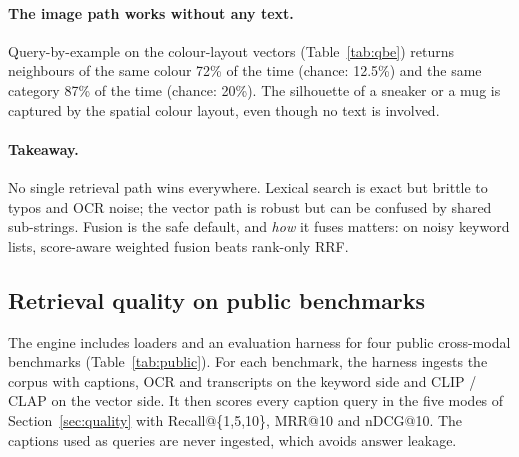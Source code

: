 \documentclass[11pt,a4paper]{article}
\newcommand{\code}[1]{\texttt{\small #1}}
\newcommand{\tab}[1]{Table~\ref{#1}}
\newcommand{\sect}[1]{Section~\ref{#1}}
\begin{document}
\begin{table}[H]
\centering\small

\caption{Query-by-example on the colour-layout image vectors, \code{SIMILAR(image\_vec, DOC(id))}:
the fraction of the 10 nearest images (excluding the query) that share the query image's colour or
category, over 60 random product queries.}
\label{tab:qbe}
\end{table}

\paragraph{The image path works without any text.} Query-by-example on the colour-layout vectors
(\tab{tab:qbe}) returns neighbours of the same colour 72\% of the time (chance: 12.5\%) and the same
category 87\% of the time (chance: 20\%). The silhouette of a sneaker or a mug is captured by the
spatial colour layout, even though no text is involved.

\paragraph{Takeaway.} No single retrieval path wins everywhere. Lexical search is exact but brittle to
typos and OCR noise; the vector path is robust but can be confused by shared sub-strings. Fusion is the
safe default, and \emph{how} it fuses matters: on noisy keyword lists, score-aware weighted fusion
beats rank-only RRF.

\subsection{Retrieval quality on public benchmarks}
\label{sec:public}

The engine includes loaders and an evaluation harness for
four public cross-modal benchmarks (\tab{tab:public}). For each benchmark, the harness ingests the
corpus with captions, OCR and transcripts on the keyword side and CLIP / CLAP on the vector side. It
then scores every caption query in the five modes of \sect{sec:quality} with Recall@\{1,5,10\}, MRR@10
and nDCG@10. The captions used as queries are never ingested, which avoids answer leakage.
\end{document}
